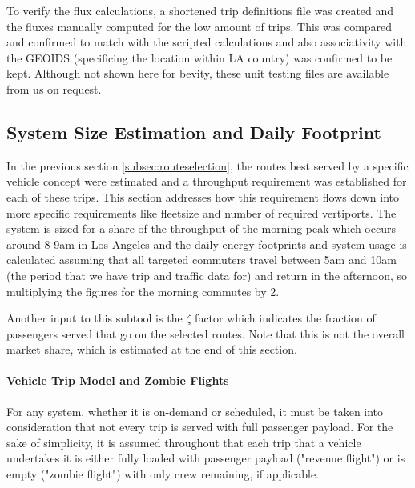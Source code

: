 To verify the flux calculations, a shortened trip definitions file was created and the fluxes manually computed for the low amount of trips. This was compared and confirmed to match with the scripted calculations and also associativity with the GEOIDS (specificing the location within LA country) was confirmed to be kept. Although not shown here for bevity, these unit testing files are available from us on request.
\fi



\subsection{System Size Estimation and Daily Footprint}

In the previous section \ref{subsec:routeselection}, the routes best served by a specific vehicle concept were estimated and a throughput requirement was established for each of these trips. This section addresses how this requirement flows down into more specific requirements like fleetsize and number of required vertiports. The system is sized for a share of the throughput of the morning peak which occurs around 8-9am in Los Angeles and the daily energy footprints and system usage is calculated assuming that all targeted commuters travel between 5am and 10am (the period that we have trip and traffic data for) and return in the afternoon, so multiplying the figures for the morning commutes by 2.

Another input to this subtool is the $\zeta$ factor which indicates the fraction of passengers served that go on the selected routes. Note that this is not the overall market share, which is estimated at the end of this section.


\paragraph{Vehicle Trip Model and Zombie Flights}

For any system, whether it is on-demand or scheduled, it must be taken into consideration that not every trip is served with full passenger payload. For the sake of simplicity, it is assumed throughout that each trip that a vehicle undertakes it is either fully loaded with passenger payload ("revenue flight") or is empty ("zombie flight") with only crew remaining, if applicable.

